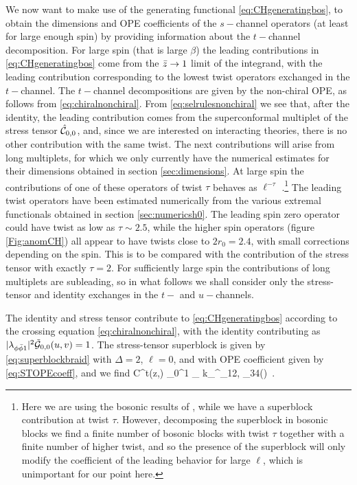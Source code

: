 We now want to make use of the generating functional \eqref{eq:CHgeneratingbos}, to obtain the dimensions and OPE coefficients of the $s-$channel operators (at least for large enough spin) by providing information about the $t-$channel decomposition.
For large spin (that is large $\beta$) the leading contributions in \eqref{eq:CHgeneratingbos} come from the ${\bar{z}} \to 1$ limit of the integrand, with the leading contribution corresponding to the lowest twist operators exchanged in the $t-$channel.
The $t-$channel decompositions are given by the non-chiral OPE, as follows from \eqref{eq:chiralnonchiral}.
From \eqref{eq:selrulesnonchiral} we see that, after the identity, the leading contribution comes from the superconformal multiplet of the stress tensor $\hat{{\mathcal{C}}}_{0,0}$, and, since we are interested on interacting theories, there is no other contribution with the same twist. The next contributions will arise from long multiplets, for which we only currently have the numerical estimates for their dimensions  obtained in section \ref{sec:dimensions}. At large spin the contributions of one of these operators of twist $\tau$ behaves as $\ell^{-\tau}$ \cite{Fitzpatrick:2012yx,  Caron-Huot:2017vep}.\footnote{Here we are using the bosonic results of \cite{Fitzpatrick:2012yx,  Caron-Huot:2017vep}, while we have a superblock contribution at twist $\tau$. However, decomposing the superblock in bosonic blocks we find a finite number of bosonic blocks with twist $\tau$ together with a finite number of higher twist, and so the presence  of the superblock will only modify the coefficient of the leading behavior for large $\ell$, which is unimportant for our point here.}
The leading twist operators have been estimated numerically from the various extremal functionals obtained in section \ref{sec:numericsh0}. The leading spin zero operator could have twist as low as $\tau \sim 2.5$, while the higher spin operators (figure \ref{Fig:anomCH}) all appear to have twists close to $2r_0=2.4$, with small corrections depending on the spin. This is to be compared with the contribution of the stress tensor with exactly $\tau=2$.
For sufficiently large spin the contributions of long multiplets are subleading,
so in what follows we shall consider only the stress-tensor and identity exchanges in the $t-$ and $u-$channels.

The identity and stress tensor contribute to \eqref{eq:CHgeneratingbos} according to the crossing equation \eqref{eq:chiralnonchiral}, with the identity contributing as $|\lambda_{\phi \bar{\phi} 1}|^2 \tilde{{\mathcal{G}}}_{0,0}(u,v)=1$. The stress-tensor superblock is given by \eqref{eq:superblockbraid} with $\Delta=2$, $\ell=0$, and with OPE coefficient given by \eqref{eq:STOPEcoeff}, and we  find
%
\be 
C^t(z,\beta) \supset \int\limits_0^1  \kappa_{\beta} k_\beta^{\Delta_{12}, \Delta_{34}}(\zb) \dDisc{}\,.
\label{eq:nonchiral_lead}
\ee
%

